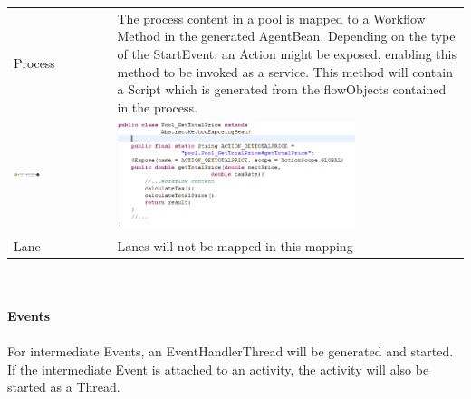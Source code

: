 			 
		\begin{tabularx}{\linewidth}{|l|X|}\hline\hline
			 Process & The process content in a pool is mapped to a Workflow Method in the generated AgentBean. Depending on the type of the StartEvent, an Action might be exposed, enabling this method to be invoked as a service. This method will contain a Script which is generated from the flowObjects contained in the process.\\
			 \includegraphics[width=0.3\textwidth]{images/mapping/process.png}  & \includegraphics[width=0.7\textwidth]{images/mapping/processcode.png}\\\hline
			 Lane & Lanes will not be mapped in this mapping\\\hline \hline
		\end{tabularx}\\\\
\textbf{\Large{Events}}\\\\
For intermediate Events, an EventHandlerThread will be generated and started. If the intermediate Event is attached to an activity, the activity will also be started as a Thread. 

